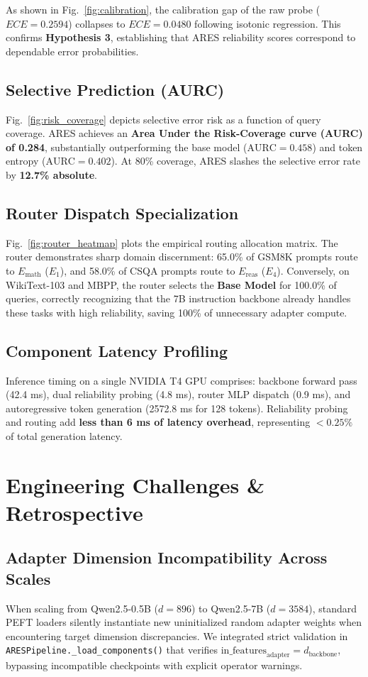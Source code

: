\documentclass[journal,10pt,twocolumn]{IEEEtran}
\begin{document}
As shown in Fig.~\ref{fig:calibration}, the calibration gap of the raw probe ($ECE = 0.2594$) collapses to \textbf{$ECE = 0.0480$} following isotonic regression. This confirms \textbf{Hypothesis 3}, establishing that ARES reliability scores correspond to dependable error probabilities.

\subsection{Selective Prediction (AURC)}
Fig.~\ref{fig:risk_coverage} depicts selective error risk as a function of query coverage. ARES achieves an \textbf{Area Under the Risk-Coverage curve (AURC) of 0.284}, substantially outperforming the base model ($\text{AURC} = 0.458$) and token entropy ($\text{AURC} = 0.402$). At 80\% coverage, ARES slashes the selective error rate by \textbf{12.7\% absolute}.

\subsection{Router Dispatch Specialization}
Fig.~\ref{fig:router_heatmap} plots the empirical routing allocation matrix. The router demonstrates sharp domain discernment: 65.0\% of GSM8K prompts route to $E_{\text{math}}$ ($E_1$), and 58.0\% of CSQA prompts route to $E_{\text{reas}}$ ($E_4$). Conversely, on WikiText-103 and MBPP, the router selects the \textbf{Base Model} for 100.0\% of queries, correctly recognizing that the 7B instruction backbone already handles these tasks with high reliability, saving 100\% of unnecessary adapter compute.

\subsection{Component Latency Profiling}
Inference timing on a single NVIDIA T4 GPU comprises: backbone forward pass (42.4 ms), dual reliability probing (4.8 ms), router MLP dispatch (0.9 ms), and autoregressive token generation (2572.8 ms for 128 tokens). Reliability probing and routing add \textbf{less than 6 ms of latency overhead}, representing $< 0.25\%$ of total generation latency.

\section{Engineering Challenges \& Retrospective}
\label{sec:engineering}

\subsection{Adapter Dimension Incompatibility Across Scales}
When scaling from Qwen2.5-0.5B ($d=896$) to Qwen2.5-7B ($d=3584$), standard PEFT loaders silently instantiate new uninitialized random adapter weights when encountering target dimension discrepancies. We integrated strict validation in \texttt{ARESPipeline.\_load\_components()} that verifies $\text{in\_features}_{\text{adapter}} = d_{\text{backbone}}$, bypassing incompatible checkpoints with explicit operator warnings.
\end{document}
